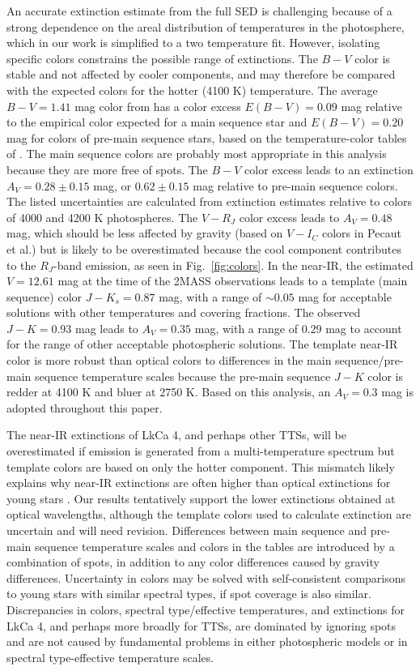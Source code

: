 \documentclass[twocolumn]{emulateapj}%
\begin{document}
An accurate extinction estimate from the full SED is challenging because of a strong dependence on the areal distribution of temperatures in the photosphere, which in our work is simplified to a two temperature fit.  However, isolating specific colors constrains the possible range of extinctions.  
The $B-V$ color is stable and not affected by cooler components, and may therefore be compared with the expected colors for the hotter (4100 K) temperature.  
The average $B-V=1.41$ mag color from \citet{grankin08} has a color excess $E(B-V)=0.09$ mag relative to the empirical color expected for a main sequence star and $E(B-V)=0.20$ mag for colors of pre-main sequence stars, based on the temperature-color tables of \citep{pecaut13}.  The main sequence colors are probably most 
appropriate in this analysis because they are more free of spots.  
The $B-V$ color 
excess leads to an extinction $A_V=0.28\pm0.15$ mag, or $0.62\pm0.15$ mag relative to 
pre-main sequence colors.   The listed uncertainties are calculated from extinction estimates relative to colors of 4000 and 4200 K photospheres.
The $V-R_J$ color excess leads to $A_V=0.48$ mag, which should be less affected by gravity (based on $V-I_C$ colors in Pecaut et al.) but is likely to be overestimated because the cool component contributes to the $R_J$-band emission, as seen in Fig.~\ref{fig:colors}.
In the near-IR, the estimated $V=12.61$ mag at the time of the 2MASS observations leads to a template (main sequence) color 
$J-K_s=0.87$ mag, with a range of $\sim 0.05$ mag for acceptable solutions with other 
temperatures and covering fractions. The observed $J-K=0.93$ mag leads to $A_V=0.35$ mag, 
with a range of $0.29$ mag to account for the range of other acceptable photospheric solutions.  
The template near-IR color is more robust than optical colors to differences 
in the main sequence/pre-main sequence temperature scales because the pre-main 
sequence $J-K$ color is redder at 4100 K and bluer at 2750 K.  Based on this 
analysis, an $A_V=0.3$ mag is adopted throughout this paper. 

The near-IR extinctions of LkCa 4, and perhaps other TTSs, will be overestimated if emission is generated from a multi-temperature spectrum but template colors are based on only the hotter component.  This mismatch likely explains why near-IR extinctions are often higher than optical extinctions for young stars \citep[see analysis in][]{herczeg14}.  Our results tentatively support the lower extinctions obtained at optical wavelengths, although the template colors used to calculate extinction are uncertain and will need revision.  Differences between main sequence and pre-main sequence temperature scales and colors in the \citet{pecaut13} tables are introduced by a combination of spots, in addition to any color differences caused by gravity differences.
Uncertainty in colors may be solved with self-consistent comparisons to young stars with similar spectral types, if spot coverage is also similar.  Discrepancies in colors, spectral type/effective temperatures, and extinctions for LkCa 4, and perhaps more broadly for TTSs, are dominated by ignoring spots and are not caused by fundamental problems in either photospheric models or in spectral type-effective temperature scales.
\end{document}
